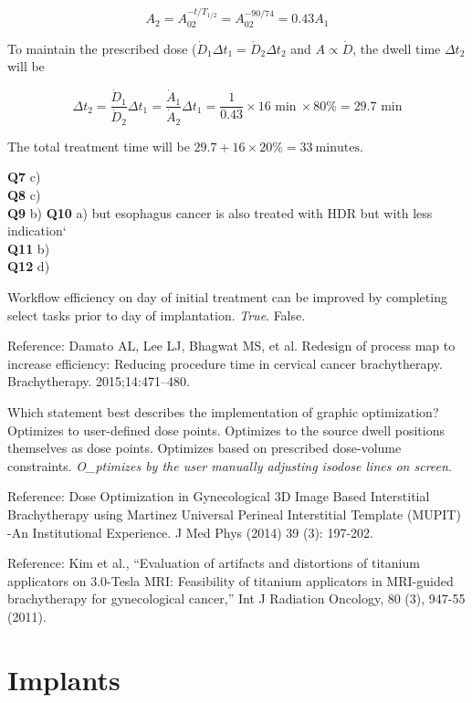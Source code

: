 \documentclass[]{book}
\theoremstyle{definition}
\theoremstyle{definition}
\theoremstyle{definition}
\theoremstyle{remark}
\begin{document}
\begin{equation*}
A_2 = A_02^{-t/T_{1/2}}=A_02^{-90/74}=0.43A_1
\end{equation*}

To maintain the prescribed dose
(\(\dot D_1 \Delta t_1 = \dot D_2 \Delta t_2\) and \(A \propto \dot D\),
the dwell time \(\Delta t_2\) will be

\begin{equation*} {\Delta t_2 = \frac{\dot D_1}{\dot D_2} \Delta t_1 = \frac{\dot A_1}{\dot A_2} \Delta t_1 = \frac{1}{0.43}\times 16 \text{ min} \ \times 80\% = \boxed{29.7 \text{ min}}}
\end{equation*}

The total treatment time will be
\(29.7 + 16\times20\%=\boxed{33\ \text{minutes}}\).

\textbf{Q7} c)\\
\textbf{Q8} c)\\
\textbf{Q9} b) \textbf{Q10} a) but esophagus cancer is also treated with
HDR but with less indication`\\
\textbf{Q11} b)\\
\textbf{Q12} d)

Workflow efficiency on day of initial treatment can be improved by
completing select tasks prior to day of implantation. \emph{True}.
False.

Reference: Damato AL, Lee LJ, Bhagwat MS, et al. Redesign of process map
to increase efficiency: Reducing procedure time in cervical cancer
brachytherapy. Brachytherapy. 2015;14:471--480.

Which statement best describes the implementation of graphic
optimization? Optimizes to user-defined dose points. Optimizes to the
source dwell positions themselves as dose points. Optimizes based on
prescribed dose-volume constraints. \emph{O\_ptimizes by the user
manually adjusting isodose lines on screen}.

Reference: Dose Optimization in Gynecological 3D Image Based
Interstitial Brachytherapy using Martinez Universal Perineal
Interstitial Template (MUPIT) -An Institutional Experience. J Med Phys
(2014) 39 (3): 197-202.

Reference: Kim et al., ``Evaluation of artifacts and distortions of
titanium applicators on 3.0-Tesla MRI: Feasibility of titanium
applicators in MRI-guided brachytherapy for gynecological cancer,'' Int
J Radiation Oncology, 80 (3), 947-55 (2011).

\chapter{Implants}\label{implants}
\end{document}
